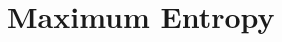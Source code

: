 \documentclass[c, dvipsnames]{beamer}  %
\begin{document}
%
%
%
%
%
%
%
%
%
%
%


\section{Maximum Entropy}
\end{document}
